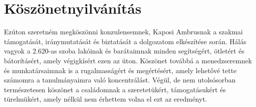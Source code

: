 \chapter{Köszönetnyilvánítás}
\label{ch:thanks}

Ezúton szeretném megköszönni konzulensemnek, Kaposi Ambrusnak a szakmai támogatását, iránymutatását és biztatását a dolgozatom elkészítése során. Hálás vagyok a 2.620-as szoba lakóinak és barátaimnak minden segítségért, ötletért és bátorításért, amely végigkísért ezen az úton. Köszönet továbbá a menedzseremnek és munkatársaimnak is a rugalmasságért és megértésért, amely lehetővé tette számomra a tanulmányaimra való koncentrálást. Végül, de nem utolsósorban természetesen köszönet a családomnak a szeretetükért, támogatásukért és türelmükért, amely nélkül nem érhettem volna el ezt az eredményt.
